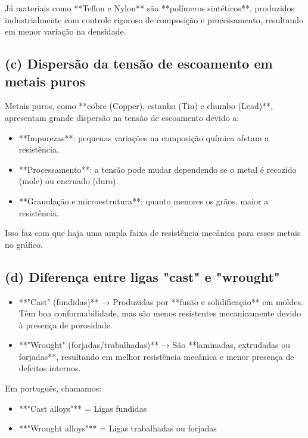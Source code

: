 Já materiais como **Teflon e Nylon** são **polímeros sintéticos**, produzidos industrialmente com controle rigoroso de composição e processamento, resultando em menor variação na densidade.

\subsection{(c) Dispersão da tensão de escoamento em metais puros}

Metais puros, como **cobre (Copper), estanho (Tin) e chumbo (Lead)**, apresentam grande dispersão na tensão de escoamento devido a:

\begin{itemize}
    \item **Impurezas**: pequenas variações na composição química afetam a resistência.
    \item **Processamento**: a tensão pode mudar dependendo se o metal é recozido (mole) ou encruado (duro).
    \item **Granulação e microestrutura**: quanto menores os grãos, maior a resistência.
\end{itemize}

Isso faz com que haja uma ampla faixa de resistência mecânica para esses metais no gráfico.

\subsection{(d) Diferença entre ligas "cast" e "wrought"}

\begin{itemize}
    \item **"Cast" (fundidas)** → Produzidas por **fusão e solidificação** em moldes. Têm boa conformabilidade, mas são menos resistentes mecanicamente devido à presença de porosidade.
    \item **"Wrought" (forjadas/trabalhadas)** → São **laminadas, extrudadas ou forjadas**, resultando em melhor resistência mecânica e menor presença de defeitos internos.
\end{itemize}

Em português, chamamos:

\begin{itemize}
    \item **"Cast alloys"** = Ligas fundidas
    \item **"Wrought alloys"** = Ligas trabalhadas ou forjadas
\end{itemize}

